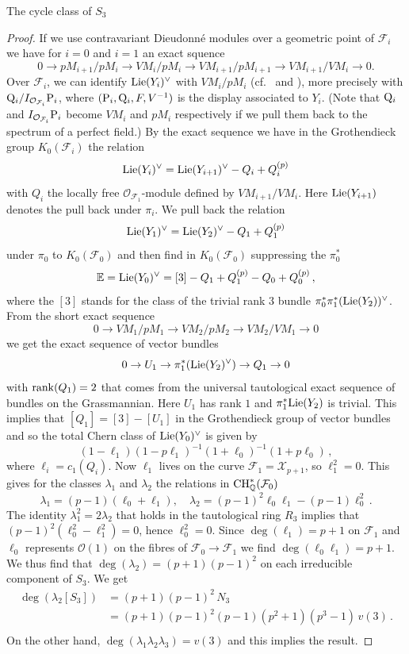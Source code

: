 \documentclass[11pt]{amsart}
\numberwithin{equation}{section}
\newcommand{\EE}{\mathbb E}
\newcommand{\QQ}{\mathbb Q}
\theoremstyle{definition}
\theoremstyle{remark}
\begin{document}
\begin{section}{The cycle class of $S_3$}
\begin{proof}
If we use contravariant Dieudonn\'e modules 
over a geometric point of ${\mathcal F}_i$
we have for $i=0$ and $i=1$
 an exact squence
$$
0 \to pM_{i+1}/pM_i \to VM_i/pM_i \to VM_{i+1}/pM_{i+1} \to VM_{i+1}/VM_i \to 0.
$$
Over ${\mathcal F}_i$,
we can identify ${\rm Lie}(Y_i)^{\vee}$ with $VM_i/pM_i$ (cf.~\cite[4.3.12]{BGM} and \cite[5.4, 7.4]{L-O}),
more precisely with ${\rm Q}_i/I_{\mathcal{O}_{\mathcal{F}_i}}{\rm P}_i$, where $({\rm P}_i,{\rm Q}_i,F,V^{-1})$ 
is the display associated to $Y_i$. 
(Note that ${\rm Q}_i$ and $I_{\mathcal{O}_{\mathcal{F}_i}} {\rm P}_i$ become $VM_i$ and $pM_i$ 
respectively if we pull them back to the spectrum of a perfect field.)
By the exact sequence we have in the Grothendieck group
$K_0(\mathcal{F}_i)$ the relation
$$
{\rm Lie}(Y_i)^{\vee} ={\rm Lie}(Y_{i+1})^{\vee}-Q_i+ Q_{i}^{(p)}
$$
with $Q_i$ the locally free $\mathcal{O}_{\mathcal{F}_1}$-module defined
by $VM_{i+1}/VM_i$.
Here ${\rm Lie}(Y_{i+1})$ denotes the pull back under $\pi_i$.
We pull back the relation
$$
{\rm Lie}(Y_1)^{\vee}={\rm Lie}(Y_2)^{\vee}-Q_1+Q_1^{(p)}
$$
under $\pi_0$ to $K_0(\mathcal{F}_0)$ and then find
in $K_0(\mathcal{F}_0)$ suppressing the $\pi_0^*$
$$
{\EE}={\rm Lie}(Y_0)^{\vee}= [3]-Q_1+Q_1^{(p)}-Q_0+Q_0^{(p)}\, ,
$$
where the $[3]$ stands for the class of the
trivial rank $3$ bundle $\pi_0^*\pi_1^*({\rm Lie}(Y_2))^{\vee}$.
From the short exact sequence
$$
0 \to VM_1/pM_1 \to VM_2/pM_2 \to VM_2/VM_1 \to 0
$$
we get the exact sequence of vector bundles
$$
0 \to U_1 \to \pi_1^*({\rm Lie}(Y_2)^{\vee}) \to Q_1\to 0
$$
with ${\rm rank}(Q_1)=2$
that comes from the universal tautological exact sequence of bundles
on the Grassmannian. Here $U_1$ has rank $1$ and $\pi_1^*{\rm Lie}(Y_2)$ is trivial. This
implies that $[Q_1]=[3]-[U_1]$ in the Grothendieck group of vector bundles and so the total Chern
class of ${\rm Lie}(Y_0)^{\vee}$ is given by
$$
(1-\ell_1)(1-p\ell_1)^{-1}(1+\ell_0)^{-1}(1+p\ell_0)\, ,
$$
where $\ell_i=c_1(Q_i)$.
Now $\ell_1$ lives on the curve $\mathcal{F}_1=\mathcal{X}_{p+1}$, so $\ell_1^2=0$.
This gives for the classes $\lambda_1$ and $\lambda_2$
the relations in ${\rm CH}_{\QQ}^{*}(\mathcal{F}_0)$
$$
\lambda_1=(p-1)(\ell_0+\ell_1), \quad
\lambda_2=(p-1)^2\ell_0\ell_1- (p-1)\ell_0^2\, .
$$
The identity $\lambda_1^2=2\lambda_2$ that holds in 
the tautological ring $R_3$ 
implies that $(p-1)^2(\ell_0^2-\ell_1^2)=0$, hence $\ell_0^2=0$.
Since $\deg(\ell_1)=p+1$ on $\mathcal{F}_1$ and $\ell_0$ represents $\mathcal{O}(1)$
on the fibres of $\mathcal{F}_0\to \mathcal{F}_1$ we find $\deg(\ell_0\ell_1)=
p+1$. We thus find that $\deg(\lambda_2)=(p+1)(p-1)^2$ on each irreducible
component of $S_3$. We get
$$
\begin{aligned}
\deg (\lambda_2 [S_3])& =(p+1)(p-1)^2\, N_3 \\
&= (p+1)(p-1)^2 (p-1)(p^2+1)(p^3-1)\, v(3)\, .\\
\end{aligned}
$$
On the other hand, $\deg(\lambda_1 \lambda_2\lambda_3)=v(3)$ 
and this implies the result.
\end{proof}


\end{section}
\end{document}

